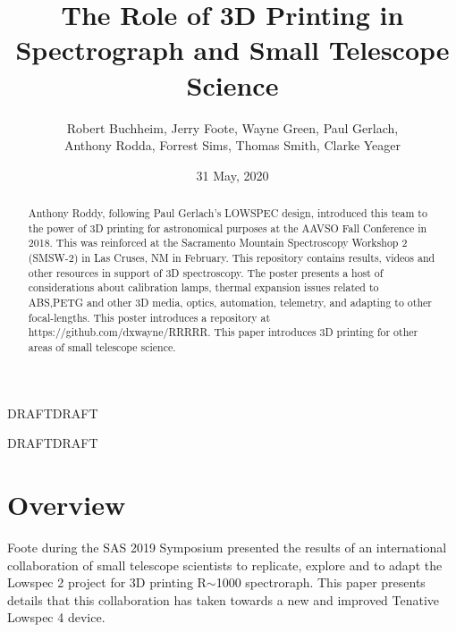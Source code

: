 \documentclass[letter,11pt,oneside]{article}
\def\documentisdraft{DRAFT}  %
\def\drafttest{DRAFT}
\newcommand{\newlowspec}{Tenative Lowspec 4}
\begin{document}


\title{The Role of 3D Printing in Spectrograph and Small Telescope Science}
\author{Robert Buchheim, Jerry Foote, Wayne Green, Paul Gerlach, \\
  Anthony Rodda, Forrest Sims, Thomas Smith, Clarke Yeager}
\date{31 May, 2020}
\maketitle

\begin{abstract}
   Anthony Roddy, following Paul Gerlach's LOWSPEC design, introduced
   this team to the power of 3D printing for astronomical purposes at
   the AAVSO Fall Conference in 2018. This was reinforced at the
   Sacramento Mountain Spectroscopy Workshop 2 (SMSW-2) in Las Cruses,
   NM in February. This repository contains results, videos and other
   resources in support of 3D spectroscopy. The poster presents a host
   of considerations about calibration lamps, thermal expansion issues
   related to ABS,PETG and other 3D media, optics, automation,
   telemetry, and adapting to other focal-lengths. This poster
   introduces a repository at https://github.com/dxwayne/RRRRR. This
   paper introduces 3D printing for other areas of small telescope
   science.
\end{abstract}

\ifx\documentisdraft\drafttest
\renewcommand*\contentsname{REMOVE CONTENTS FROM PAPER}
\tableofcontents
\listoffigures
\listoftables
\newpage
\fi


\setcounter{section}{0}

\ifx\documentisdraft\drafttest
\linenumbers    %
\fi

\section{Overview}

Foote \cite{Lowspec2} during the SAS 2019 Symposium presented the
results of an international collaboration of small telescope scientists
to replicate, explore and to adapt the Lowspec 2 project \cite{Gerlach}
for 3D printing R$\sim$1000 spectroraph. This paper presents details
that this collaboration has taken towards a new and improved \newlowspec
device.
\end{document}
